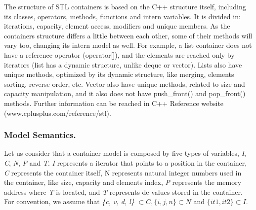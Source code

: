 \documentclass[a4paper]{llncs}
\begin{document}
	The structure of STL containers is based on the C++ structure itself, including its classes, operators, methods, functions and intern variables. It is divided in: iterations, capacity, element access, modifiers and unique members. As the containers structure differs a little between each other, some of their methods will vary too, changing its intern model as well. For example, a list container does not have a reference operator (operator[]), and the elements are reached only by iterators (list has a dynamic structure, unlike deque or vector). Lists also have unique methods, optimized by its dynamic structure, like merging, elements sorting, reverse order, etc.
	Vector also have unique methods, related to size and capacity manipulation, and it also does not have push\_front() and pop\_front() methods. Further information can be reached in C++ Reference website (www.cplusplus.com/reference/stl).

	
\subsubsection{Model Semantics.}
	
	Let us consider that a container model is composed by five types of variables, \emph{I}, \emph{C}, \emph{N}, \emph{P} and \emph{T}. \emph{I} represents a iterator that points to a position in the container, \emph{C} represents the container itself, N represents natural integer numbers used in the container, like size, capacity and elements index, \emph{P} represents the memory address where \emph{T} is located, and \emph{T} represents de values stored in the container. For convention, we assume that \emph{\{c, v, d, l\}} $\subset C, \{i, j, n\} \subset N$ and $\{it1, it2\} \subset I$. 
	
\end{document}
